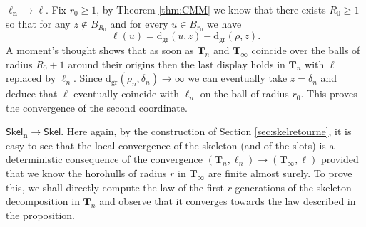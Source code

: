 \documentclass[10pt]{amsart}
\theoremstyle{definition}\newtheorem{defi}[theo]{Definition}\newtheorem{rema}[theo]{Remark}\newtheorem{exam}[theo]{Example}\newtheorem{exem}[theo]{Example}\newtheorem{nota}[theo]{Notation}
\begin{document}
$\boldsymbol{\ell_{n} \to \ell}$. Fix $r_{0} \geq 1$, by Theorem \ref{thm:CMM} we know that there exists $R_{0} \geq 1$ so that for any $z \notin B_{R_{0}}$ and for every $u \in B_{r_{0}}$ we have
$$ \ell(u) = \mathrm{d_{gr}}(u,z)- \mathrm{d_{gr}}(\rho,z).$$
A moment's thought shows that as soon as $ \mathbf{T}_{n}$ and $ \mathbf{T}_{\infty}$ coincide over the balls of radius $R_{0}+1$ around their origins then the last display holds in $ \mathbf{T}_{n}$ with $\ell$ replaced by $\ell_{n}$.  Since $ \mathrm{d_{gr}}(\rho_{n}, \delta_{n}) \to \infty$ we can eventually take $z= \delta_{n}$  and deduce that $\ell$ eventually coincide with $\ell_{n}$ on the ball of radius  $r_{0}$. This proves the convergence of the second coordinate.

$\boldsymbol{ \mathsf{Skel}_{n} \to \mathsf{Skel}}$. Here again, by the construction of Section \ref{sec:skelretourne}, it is easy to see that the local convergence of the skeleton (and of the slots) is a deterministic consequence of the convergence $( \mathbf{T}_{n}, \ell_{n}) \to ( \mathbf{T}_{\infty},\ell)$ provided that we know the horohulls of radius $r$ in $ \mathbf{T}_{\infty}$ are finite almost surely. To prove this, we shall directly compute the law of the first $r$ generations of the skeleton decomposition in $ \mathbf{T}_{n}$ and observe that it converges towards the law described in the proposition.
\end{document}
